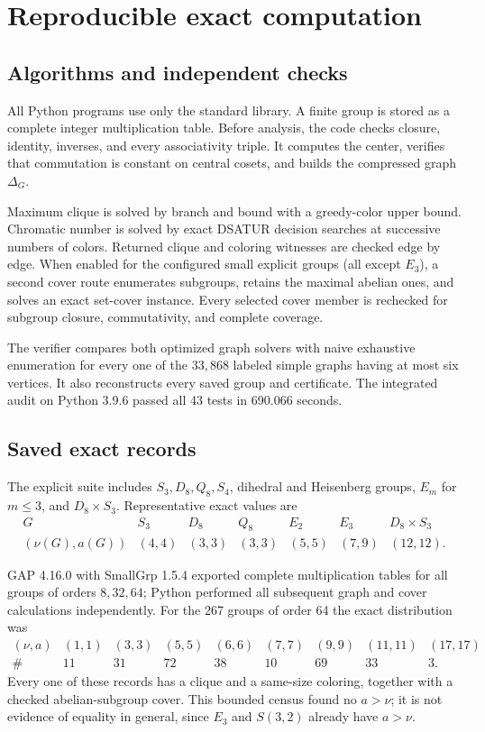 \appendix
\section{Reproducible exact computation}\label{app:computation}

\subsection{Algorithms and independent checks}

All Python programs use only the standard library. A finite group is stored
as a complete integer multiplication table. Before analysis, the code checks
closure, identity, inverses, and every associativity triple. It computes the
center, verifies that commutation is constant on central cosets, and builds
the compressed graph \(\Delta_G\).

Maximum clique is solved by branch and bound with a greedy-color upper bound.
Chromatic number is solved by exact DSATUR decision searches at successive
numbers of colors. Returned clique and coloring witnesses are checked edge
by edge. When enabled for the configured small explicit groups (all except
\(E_3\)), a second cover route enumerates subgroups, retains the maximal
abelian ones, and solves an exact set-cover instance. Every selected cover
member is rechecked for subgroup closure, commutativity, and complete
coverage.

The verifier compares both optimized graph solvers with naive exhaustive
enumeration for every one of the \(33{,}868\) labeled simple graphs having at
most six vertices. It also reconstructs every saved group and certificate.
The integrated audit on Python 3.9.6 passed all 43 tests in 690.066 seconds.

\subsection{Saved exact records}

The explicit suite includes \(S_3,D_8,Q_8,S_4\), dihedral and Heisenberg
groups, \(E_m\) for \(m\le3\), and \(D_8\times S_3\). Representative exact
values are
\[
\begin{array}{c|cccccc}
G&S_3&D_8&Q_8&E_2&E_3&D_8\times S_3\\ \hline
(\nu(G),a(G))&(4,4)&(3,3)&(3,3)&(5,5)&(7,9)&(12,12).
\end{array}
\]

GAP 4.16.0 with SmallGrp 1.5.4 exported complete multiplication tables for
all groups of orders \(8,32,64\); Python performed all subsequent graph and
cover calculations independently. For the 267 groups of order 64 the exact
distribution was
\[
\begin{array}{c|rrrrrrrr}
(\nu,a)&(1,1)&(3,3)&(5,5)&(6,6)&(7,7)&(9,9)&(11,11)&(17,17)\\ \hline
\#&11&31&72&38&10&69&33&3.
\end{array}
\]
Every one of these records has a clique and a same-size coloring, together
with a checked abelian-subgroup cover. This bounded census found no
\(a>\nu\); it is not evidence of equality in general, since \(E_3\) and
\(S(3,2)\) already have \(a>\nu\).

